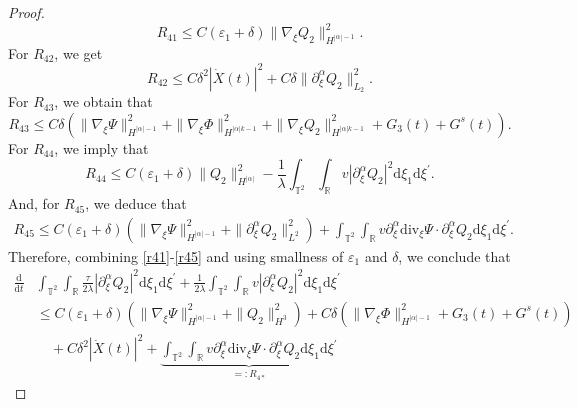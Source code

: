 \documentclass[10pt,reqno]{amsart}
\numberwithin{equation}{section}
\newcommand{\dif}{\mathrm{d}}
\newcommand{\ddiv}{\mathrm{div}}
\begin{document}
\begin{proof}
\begin{equation}\label{r41}
R_{41}
\le C(\varepsilon_1+\delta) \|\nabla_\xi Q_2\|_{H^{|\alpha|-1}}^2.
\end{equation}
For $R_{42}$, we get
\begin{equation}\label{r42}
R_{42}\le C\delta^2|\dot{X}(t)|^2+C\delta\|\partial_\xi^\alpha Q_2\|_{L_2}^2.
\end{equation}
For $R_{43}$, we obtain that
\begin{equation}\label{r43}
R_{43}\le C\delta\left(\|\nabla_\xi\Psi\|_{H^{|\alpha|-1}}^2+\|\nabla_\xi\Phi\|_{H^{|\alpha|k-1}}^2+
\|\nabla_\xi Q_2\|_{H^{|\alpha|k-1}}^2+G_3(t)+G^s(t)\right).
\end{equation}
For $R_{44}$, we imply that
\begin{equation}\label{r44}
R_{44}
\le
C(\varepsilon_1+\delta)\|Q_2\|_{H^{|\alpha|}}^2
-\frac{1}{\lambda}\int_{\mathbb{T}^2}\int_{\mathbb{R}}
 v|\partial_\xi^\alpha Q_2|^2\dif \xi_1\dif \xi^{\prime}.
\end{equation}
And, for $R_{45}$, we deduce that
\begin{equation}\label{r45}
\begin{aligned}
R_{45}
\le  C(\varepsilon_1+\delta)\left(\|\nabla_\xi\Psi\|_{H^{|\alpha|-1}}^2+
   \|\partial_\xi^\alpha Q_2\|_{L^2}^2\right)
 +\int_{\mathbb{T}^2}\int_{\mathbb{R}}
v\partial_\xi^\alpha\ddiv_\xi\Psi\cdot\partial_\xi^\alpha Q_2
\dif \xi_1\dif \xi^{\prime}.
\end{aligned}
\end{equation}
Therefore, combining \eqref{r41}-\eqref{r45} and using smallness of $\varepsilon_1$ and $\delta$, we conclude that
\begin{equation}\label{hg1.4}
\begin{aligned}
\frac{\dif}{\dif t}&\int_{\mathbb{T}^2}\int_{\mathbb{R}}
\frac{\tau}{2\lambda}|\partial_\xi^\alpha Q_2|^2\dif \xi_1\dif \xi^{\prime}
+\frac{1}{2\lambda}\int_{\mathbb{T}^2}\int_{\mathbb{R}}
 v|\partial_\xi^\alpha Q_2|^2\dif \xi_1\dif \xi^{\prime}\\
&\le C(\varepsilon_1+\delta)\left(\|\nabla_\xi\Psi\|_{H^{|\alpha|-1}}^2+
   \| Q_2\|_{H^3}^2\right)
+C\delta\left(\|\nabla_\xi\Phi\|_{H^{|\alpha|-1}}^2+G_3(t)+G^s(t)\right)\\
&\quad+C\delta^2|\dot X(t)|^2+\underbrace{\int_{\mathbb{T}^2}\int_{\mathbb{R}}
v\partial_\xi^\alpha\ddiv_\xi \Psi\cdot\partial_\xi^\alpha Q_2\dif \xi_1\dif \xi^{\prime}}\limits_{=:R_{4\ast}}
\end{aligned}
\end{equation}


\end{proof}
\end{document}
